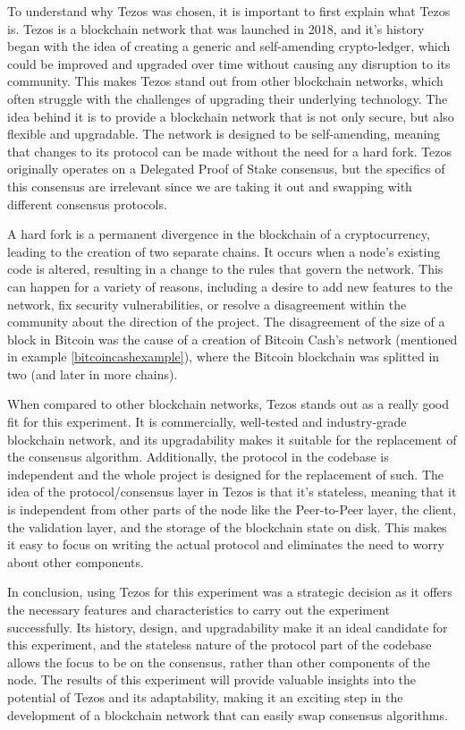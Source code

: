To understand why Tezos was chosen, it is important to first explain what Tezos is.
Tezos is a blockchain network that was launched in 2018, and it's history began with the idea of creating a generic and self-amending crypto-ledger, which could be improved and upgraded over time without causing any disruption to its community. This makes Tezos stand out from other blockchain networks, which often struggle with the challenges of upgrading their underlying technology. 
The idea behind it is to provide a blockchain network that is not only secure, but also flexible and upgradable. The network is designed to be self-amending, meaning that changes to its protocol can be made without the need for a hard fork. 
Tezos originally operates on a Delegated Proof of Stake consensus, but the specifics of this consensus are irrelevant since we are taking it out and swapping with different consensus protocols.

A hard fork is a permanent divergence in the blockchain of a cryptocurrency, leading to the creation of two separate chains. It occurs when a node's existing code is altered, resulting in a change to the rules that govern the network. 
This can happen for a variety of reasons, including a desire to add new features to the network, fix security vulnerabilities, or resolve a disagreement within the community about the direction of the project. The disagreement of the size of a block in Bitcoin was the cause of a creation of Bitcoin Cash's network (mentioned in example \ref{bitcoincashexample}), where the Bitcoin blockchain was splitted in two (and later in more chains).

When compared to other blockchain networks, Tezos stands out as a really good fit for this experiment. It is commercially, well-tested and industry-grade blockchain network, and its upgradability makes it suitable for the replacement of the consensus algorithm. Additionally, the protocol in the codebase is independent and the whole project is designed for the replacement of such. 
The idea of the protocol/consensus layer in Tezos is that it's stateless, meaning that it is independent from other parts of the node like the Peer-to-Peer layer, the client, the validation layer, and the storage of the blockchain state on disk.
This makes it easy to focus on writing the actual protocol and eliminates the need to worry about other components.


In conclusion, using Tezos for this experiment was a strategic decision as it offers the necessary features and characteristics to carry out the experiment successfully. Its history, design, and upgradability make it an ideal candidate for this experiment, and the stateless nature of the protocol part of the codebase allows the focus to be on the consensus, rather than other components of the node.
The results of this experiment will provide valuable insights into the potential of Tezos and its adaptability, making it an exciting step in the development of a blockchain network that can easily swap consensus algorithms.



